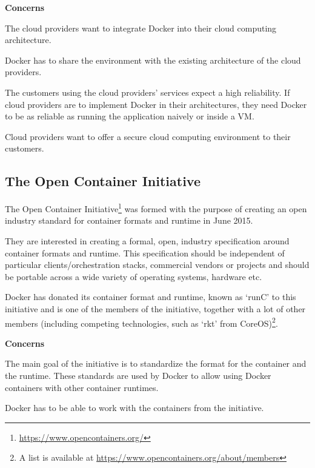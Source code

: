 \textbf{Concerns}
\begin{description}[labelindent=25pt,style=multiline,leftmargin=4.0cm,font=\normalfont\itshape]

\item[\textbf{Portability} (Installability)] The cloud providers want to integrate Docker into their cloud computing architecture.\\ 

\item[\textbf{Compatibility} (Co-Existence)] Docker has to share the environment with the existing architecture of the cloud providers.

\item[\textbf{Reliability}] The customers using the cloud providers' services expect a high reliability. If cloud providers are to implement Docker in their architectures, they need Docker to be as reliable as running the application naively or inside a VM.

\item[\textbf{Security}] Cloud providers want to offer a secure cloud computing environment to their customers.
\end{description}



\subsection*{The Open Container Initiative}

The Open Container Initiative\footnote{\url{https://www.opencontainers.org/}} was formed with the purpose of creating an open industry standard for container formats and runtime in June 2015.

They are interested in creating a formal, open, industry specification around container formats and runtime. This specification should be independent of particular clients/orchestration stacks, commercial vendors or projects and should be portable across a wide variety of operating systems, hardware etc.

Docker has donated its container format and runtime, known as `runC' to this initiative and is one of the members of the initiative, together with a lot of other members (including competing technologies, such as `rkt' from CoreOS)\footnote{A list is available at \url{https://www.opencontainers.org/about/members}}.

\textbf{Concerns}
\begin{description}[labelindent=25pt,style=multiline,leftmargin=4.0cm,font=\normalfont\itshape]

\item[\textbf{Portability}] The main goal of the initiative is to standardize the format for the container and the runtime. These standards are used by Docker to allow using Docker containers with other container runtimes.

\item[\textbf{Compatibility} (Interoperability)] Docker has to be able to work with the containers from the initiative.

\end{description}

